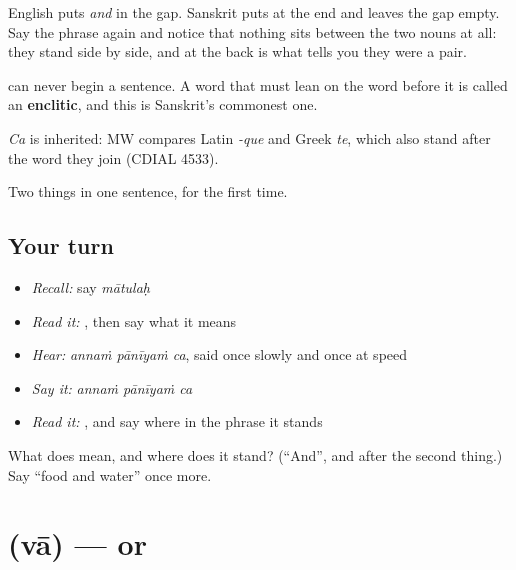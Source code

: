 English puts \emph{and} in the gap. Sanskrit puts \textbf{} at the end and leaves the gap empty. Say the phrase again and notice that nothing sits between the two nouns at all: they stand side by side, and \textbf{} at the back is what tells you they were a pair.

\textbf{} can never begin a sentence. A word that must lean on the word before it is called an \textbf{enclitic}, and this is Sanskrit's commonest one.

\begin{cousinweb}
\emph{Ca} is inherited: MW compares Latin \emph{-que} and Greek \emph{te}, which also stand after the word they join (CDIAL 4533).
\end{cousinweb}

\begin{grammarlens}[title={What you've built}]
Two things in one sentence, for the first time.
\end{grammarlens}

\subsection*{Your turn}
\begin{itemize}
\raggedright
  \item \emph{Recall:} say \emph{mātulaḥ}
  \item \emph{Read it:} \textbf{}, then say what it means
  \item \emph{Hear:} \emph{annaṁ pānīyaṁ ca}, said once slowly and once at speed
  \item \emph{Say it:} \emph{annaṁ pānīyaṁ ca}
  \item \emph{Read it:} \textbf{}, and say where in the phrase it stands
\end{itemize}

\begin{tcolorbox}[breakable,colback=teal!4,colframe=teal!35!black,title={Before you move on}]
What does \textbf{} mean, and where does it stand? (\textquotedblleft{}And\textquotedblright{}, and after the second thing.) Say \textquotedblleft{}food and water\textquotedblright{} once more.
\end{tcolorbox}
\section[\texorpdfstring{\sk{वा} (vā)}{वा (vā)}]{ (vā) — or}

\label{lesson:SA-C52-va}



